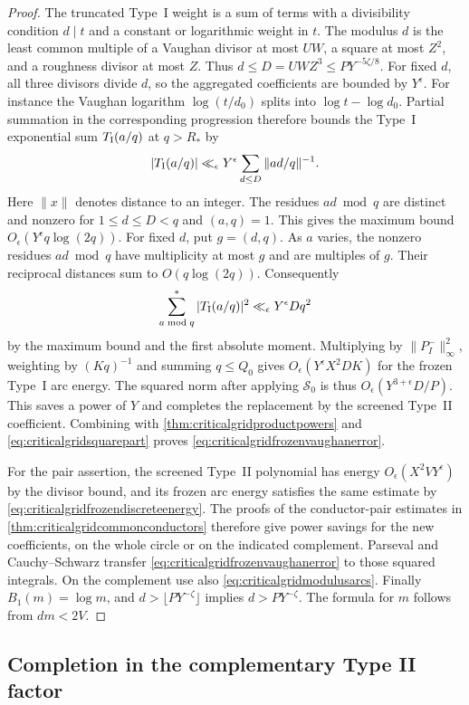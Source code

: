 \documentclass[11pt,a4paper]{article}
\numberwithin{equation}{section}
\begin{document}
\begin{proof}
The truncated Type~I weight is a sum of terms with a
divisibility condition $d\mid t$ and a constant or
logarithmic weight in $t$. The modulus $d$ is the least
common multiple of a Vaughan divisor at most $UW$,
a square at most $Z^2$, and a roughness divisor at most
$Z$. Thus $d\le D=UW Z^3\le P Y^{-5\zeta/8}$.
For fixed $d$, all three divisors divide $d$, so the
aggregated coefficients are bounded by $Y^\epsilon$.
For instance the Vaughan logarithm $\log(t/d_0)$ splits
into $\log t-\log d_0$. Partial summation in the
corresponding progression therefore bounds the Type~I
exponential sum $T_{\rm I}(a/q)$ at $q>R_*$ by
\[
 |T_{\rm I}(a/q)|\ll_\epsilon
             Y^\epsilon\sum_{d\le D}\|ad/q\|^{-1}.
\]
Here $\|x\|$ denotes distance to an integer.
The residues $ad\bmod q$ are distinct and nonzero for
$1\le d\le D<q$ and $(a,q)=1$. This gives the maximum
bound $O_\epsilon(Y^\epsilon q\log(2q))$.
For fixed $d$, put $g=(d,q)$. As $a$ varies, the nonzero
residues $ad\bmod q$ have multiplicity at most $g$ and
are multiples of $g$. Their reciprocal distances sum
to $O(q\log(2q))$. Consequently
\[
 \sum_{a\bmod q}^* |T_{\rm I}(a/q)|^2
       \ll_\epsilon Y^\epsilon D q^2
\]
by the maximum bound and the first absolute moment.
Multiplying by $\|P_I^-\|_\infty^2$, weighting by
$(Kq)^{-1}$ and summing $q\le Q_0$ gives
$O_\epsilon(Y^\epsilon X^2 D K)$ for the frozen
Type~I arc energy. The squared norm after applying
$\mathcal S_0$ is thus $O_\epsilon(Y^{3+\epsilon} D/P)$.
This saves a power of $Y$ and completes the
replacement by the screened Type~II coefficient.
Combining with \cref{thm:criticalgridproductpowers} and
\cref{eq:criticalgridsquarepart} proves
\cref{eq:criticalgridfrozenvaughanerror}.

For the pair assertion, the screened Type~II polynomial
has energy $O_\epsilon(X^2 VY^\epsilon)$ by the divisor
bound, and its frozen arc energy satisfies the same
estimate by \cref{eq:criticalgridfrozendiscreteenergy}.
The proofs of the conductor-pair estimates in
\cref{thm:criticalgridcommonconductors} therefore give
power savings for the new coefficients, on the whole
circle or on the indicated complement. Parseval and
Cauchy--Schwarz transfer \cref{eq:criticalgridfrozenvaughanerror}
to those squared integrals. On the complement use also
\cref{eq:criticalgridmodulusarcs}. Finally $B_1(m)=\log m$,
and $d>\lfloor P Y^{-\zeta}\rfloor$ implies $d>P Y^{-\zeta}$.
The formula for $m$ follows from $dm<2V$.
\end{proof}

\clearpage
\subsection{Completion in the complementary Type II factor}
\end{document}
